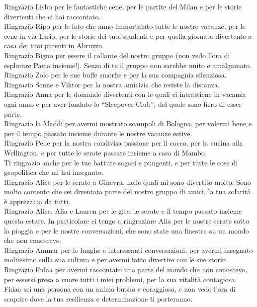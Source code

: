 Ringrazio Lisbo per le fantastiche cene, per le partite del Milan e per le storie divertenti che ci hai raccontato.\\
Ringrazio Ripo per le foto che anno immortalato tutte le nostre vacanze, per le cene in via Lario, per le storie 
dei tuoi studenti e per quella giornata divertente a casa dei tuoi parenti in Abruzzo.\\
Ringrazio Bigno per essere il collante del nostro gruppo (non vedo l’ora di esplorare Pavia insieme!). 
Senza di te il gruppo non sarebbe unito e amalgamato.\\
Ringrazio Zolo per le sue buffe smorfie e per la sua compagnia silenziosa. \\
Ringrazio Senne e Viktor per la nostra amicizia che resiste la distanza. \\
Ringrazio Anna per le domande divertenti con le quali ci intrattiene in vacanza ogni anno e per aver fondato 
lo “Sleepover Club”, del quale sono fiero di esser parte.\\
Ringrazio la Maddi per avermi mostrato scampoli di Bologna, per volermi bene e per il tempo passato insieme 
durante le nostre vacanze estive.\\
Ringrazio Pelle per la nostra condivisa passione per il cocco, per la cucina alla Wellington, e per tutte le 
serate passate insieme a casa di Mambo.\\
Ti ringrazio anche per le tue battute sagaci e pungenti, e per tutte le cose di geopolitica che mi hai insegnato.\\
Ringrazio Alice per le serate a Ginevra, nelle quali mi sono divertito molto. Sono molto contento che sei 
diventata parte del nostro gruppo di amici, la tua solarità è apprezzata da tutti.\\
Ringrazio Alice, Alia e Lauren per le gite, le serate e il tempo passato insieme questa estate.
In particolare ci tengo a ringraziare Alia per le nostre serate sotto la pioggia e per le nostre conversazioni, 
che sono state una finestra su un mondo che non conoscevo.\\
Ringrazio Ammar per le lunghe e interessanti conversazioni, per avermi insegnato moltissimo sulla sua cultura e 
per avermi fatto divertire con le sue storie.\\
Ringrazio Fidaa per avermi raccontato una parte del mondo che non conoscevo, per essersi presa a cuore tutti i 
miei problemi, per la sua vitalità contagiosa.
Fidaa sei una persona con un animo buono e coraggioso, e non vedo l’ora di scoprire dove la tua resilienza e 
determinazione ti porteranno.\\
